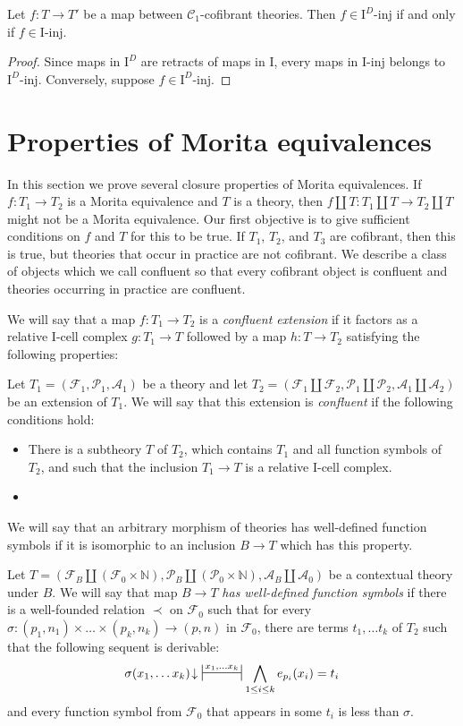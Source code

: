 \documentclass[reqno]{amsart}
\theoremstyle{definition}
\theoremstyle{remark}
\newcommand{\cof}{\mathcal{C}}
\newcommand{\I}{\mathrm{I}}
\newcommand{\class}[2]{#1\text{-}\mathrm{#2}}
\newcommand{\Iinj}[1][\I]{\class{#1}{inj}}
\numberwithin{figure}{section}
\begin{document}
\begin{lem}
Let $f : T \to T'$ be a map between $\cof_1$-cofibrant theories.
Then $f \in \Iinj[\I^D]$ if and only if $f \in \Iinj$.
\end{lem}
\begin{proof}
Since maps in $\I^D$ are retracts of maps in $\I$, every maps in $\Iinj$ belongs to $\Iinj[\I^D]$.
Conversely, suppose $f \in \Iinj[\I^D]$.
\end{proof}

\section{Properties of Morita equivalences}

In this section we prove several closure properties of Morita equivalences.
If $f : T_1 \to T_2$ is a Morita equivalence and $T$ is a theory, then $f \amalg T : T_1 \amalg T \to T_2 \amalg T$ might not be a Morita equivalence.
Our first objective is to give sufficient conditions on $f$ and $T$ for this to be true.
If $T_1$, $T_2$, and $T_3$ are cofibrant, then this is true, but theories that occur in practice are not cofibrant.
We describe a class of objects which we call confluent so that every cofibrant object is confluent and theories occurring in practice are confluent.

We will say that a map $f : T_1 \to T_2$ is a \emph{confluent extension} if it factors as a relative $\I$-cell complex $g : T_1 \to T$
followed by a map $h : T \to T_2$ satisfying the following properties:

Let $T_1 = (\mathcal{F}_1, \mathcal{P}_1, \mathcal{A}_1)$ be a theory and
let $T_2 = (\mathcal{F}_1 \amalg \mathcal{F}_2, \mathcal{P}_1 \amalg \mathcal{P}_2, \mathcal{A}_1 \amalg \mathcal{A}_2)$ be an extension of $T_1$.
We will say that this extension is \emph{confluent} if the following conditions hold:
\begin{itemize}
\item There is a subtheory $T$ of $T_2$, which contains $T_1$ and all function symbols of $T_2$, and such that the inclusion $T_1 \to T$ is a relative $\I$-cell complex.
\item 
\end{itemize}
We will say that an arbitrary morphism of theories has well-defined function symbols if it is isomorphic to an inclusion $B \to T$ which has this property.

Let $T = (\mathcal{F}_B \amalg (\mathcal{F}_0 \times \mathbb{N}), \mathcal{P}_B \amalg (\mathcal{P}_0 \times \mathbb{N}), \mathcal{A}_B \amalg \mathcal{A}_0)$
be a contextual theory under $B$.
We will say that map $B \to T$ \emph{has well-defined function symbols} if there is a well-founded relation $\prec$ on $\mathcal{F}_0$
such that for every $\sigma : (p_1,n_1) \times \ldots \times (p_k,n_k) \to (p,n)$ in $\mathcal{F}_0$,
there are terms $t_1, \ldots t_k$ of $T_2$ such that the following sequent is derivable:
\[ \sigma(x_1, \ldots x_k)\!\downarrow\ \ssststile{}{x_1, \ldots x_k} \bigwedge_{1 \leq i \leq k} e_{p_i}(x_i) = t_i \]
and every function symbol from $\mathcal{F}_0$ that appears in some $t_i$ is less than $\sigma$.
\end{document}

